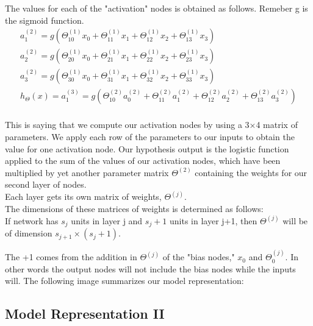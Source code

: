  The values for each of the "activation" nodes is obtained as follows.  Remeber g is the sigmoid function.\\
 \begin{equation}
   \begin{aligned}
     a_1^{(2)} = g(\Theta_{10}^{(1)}x_0 + \Theta_{11}^{(1)}x_1 + \Theta_{12}^{(1)}x_2 + \Theta_{13}^{(1)}x_3) \\
     a_2^{(2)} = g(\Theta_{20}^{(1)}x_0 + \Theta_{21}^{(1)}x_1 + \Theta_{22}^{(1)}x_2 + \Theta_{23}^{(1)}x_3) \\
     a_3^{(2)} = g(\Theta_{30}^{(1)}x_0 + \Theta_{31}^{(1)}x_1 + \Theta_{32}^{(1)}x_2 + \Theta_{33}^{(1)}x_3) \\
     h_\Theta(x) = a_1^{(3)} = g(\Theta_{10}^{(2)}a_0^{(2)} + \Theta_{11}^{(2)}a_1^{(2)} + \Theta_{12}^{(2)}a_2^{(2)} + \Theta_{13}^{(2)}a_3^{(2)}) \\
   \end{aligned}
 \end{equation}

This is saying that we compute our activation nodes by using a 3×4 matrix of parameters. We apply each row of the parameters to our inputs to obtain the value for one activation node. Our hypothesis output is the logistic function applied to the sum of the values of our activation nodes, which have been multiplied by yet another parameter matrix $\Theta^{(2)}$ containing the weights for our second layer of nodes.\\

Each layer gets its own matrix of weights, $\Theta^{(j)}$.\\

The dimensions of these matrices of weights is determined as follows:\\
If network has $s_j$ units in layer j and $s_j+1$ units in layer j+1, then $\Theta^{(j)}$ will be of dimension $s_{j+1}×(s_{j}+1)$.

The +1 comes from the addition in $\Theta^{(j)}$ of the "bias nodes," $x_0$ and $\Theta^{(j)}_{0}$. In other words the output nodes will not include the bias nodes while the inputs will. The following image summarizes our model representation:


\subsection{Model Representation II}

